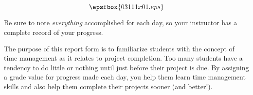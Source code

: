 

$$\epsfbox{03111x01.eps}$$

\vfil \eject






Be sure to note {\it everything} accomplished for each day, so your instructor has a complete record of your progress.







The purpose of this report form is to familiarize students with the concept of time management as it relates to project completion.  Too many students have a tendency to do little or nothing until just before their project is due.  By assigning a grade value for progress made each day, you help them learn time management skills and also help them complete their projects sooner (and better!).




